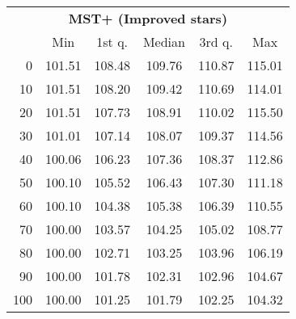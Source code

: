 \begin{tabular}{r|ccccc}
  \multicolumn{6}{c}{{\bf MST+ (Improved stars)}} \\
  & Min & 1st q. & Median & 3rd q. & Max \\ \hline\hline
  0 & 101.51 & 108.48 & 109.76 & 110.87 & 115.01
\\ 10 & 101.51 & 108.20 & 109.42 & 110.69 & 114.01
\\ 20 & 101.51 & 107.73 & 108.91 & 110.02 & 115.50
\\ 30 & 101.01 & 107.14 & 108.07 & 109.37 & 114.56
\\ 40 & 100.06 & 106.23 & 107.36 & 108.37 & 112.86
\\ 50 & 100.10 & 105.52 & 106.43 & 107.30 & 111.18
\\ 60 & 100.10 & 104.38 & 105.38 & 106.39 & 110.55
\\ 70 & 100.00 & 103.57 & 104.25 & 105.02 & 108.77
\\ 80 & 100.00 & 102.71 & 103.25 & 103.96 & 106.19
\\ 90 & 100.00 & 101.78 & 102.31 & 102.96 & 104.67
\\ 100 & 100.00 & 101.25 & 101.79 & 102.25 & 104.32
\end{tabular}
